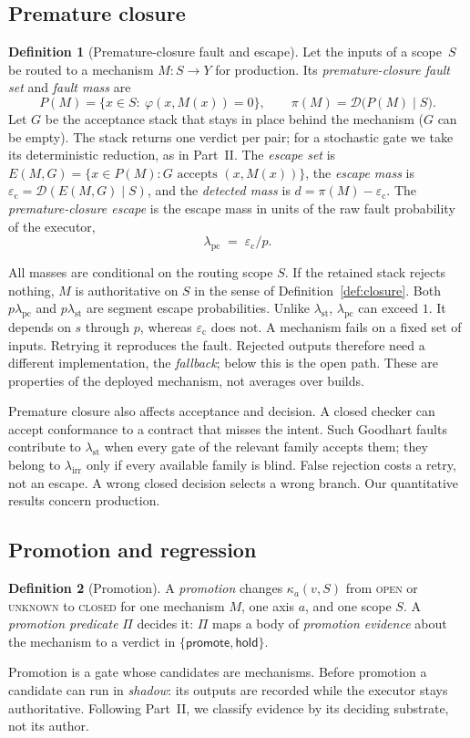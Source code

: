 \documentclass[11pt]{article}
\theoremstyle{definition}
\newtheorem{definition}{Definition}
\theoremstyle{remark}
\newcommand{\lst}{\lambda_{\mathrm{st}}}
\newcommand{\lirr}{\lambda_{\mathrm{irr}}}
\newcommand{\lpc}{\lambda_{\mathrm{pc}}}
\newcommand{\ecl}{\varepsilon_{\mathrm{c}}}
\newcommand{\D}{\mathcal{D}}
\newcommand{\cstate}[1]{\textup{\textsc{#1}}}
\begin{document}
\subsection{Premature closure}\label{sec:premature}
\begin{definition}[Premature-closure fault and escape]\label{def:pc}
Let the inputs of a scope~$S$ be routed to a mechanism $M:S\to Y$ for production. Its
\emph{premature-closure fault set} and \emph{fault mass} are
\[
P(M)=\{x\in S:\ \varphi(x,M(x))=0\},\qquad \pi(M)=\D\bigl(P(M)\mid S\bigr).
\]
Let $G$ be the acceptance stack that stays in place behind the mechanism ($G$ can be empty). The
stack returns one verdict per pair; for a stochastic gate we take its deterministic reduction, as in
Part~II. The
\emph{escape set} is $E(M,G)=\{x\in P(M): G\text{ accepts }(x,M(x))\}$, the \emph{escape mass} is
$\ecl=\D(E(M,G)\mid S)$, and the \emph{detected mass} is $d=\pi(M)-\ecl$. The \emph{premature-closure
escape} is the escape mass in units of the raw fault probability of the executor,
\[
\lpc\;=\;\ecl/p .
\]
\end{definition}

All masses are conditional on the routing scope $S$. If the retained stack rejects nothing, $M$ is
authoritative on $S$ in the sense of Definition~\ref{def:closure}.
Both $p\lpc$ and $p\lst$ are segment escape probabilities.
Unlike $\lst$, $\lpc$ can exceed $1$. It depends on $s$ through $p$, whereas $\ecl$ does not.
A mechanism fails on a fixed set of inputs. Retrying it reproduces the fault.
Rejected outputs therefore need a different implementation, the \emph{fallback}; below this is
the open path. These are properties of the deployed mechanism, not averages over builds.

Premature closure also affects acceptance and decision.
A closed checker can accept conformance to a contract that misses the intent.
Such Goodhart faults contribute to $\lst$ when every gate of the relevant family accepts them;
they belong to $\lirr$ only if every available family is blind.
False rejection costs a retry, not an escape. A wrong closed decision selects a wrong branch.
Our quantitative results concern production.

\subsection{Promotion and regression}\label{sec:transitions}
\begin{definition}[Promotion]\label{def:promotion}
A \emph{promotion} changes $\kappa_a(v,S)$ from \cstate{open} or \cstate{unknown} to \cstate{closed}
for one mechanism $M$, one axis $a$, and one scope $S$. A \emph{promotion predicate} $\Pi$ decides it:
$\Pi$ maps a body of \emph{promotion evidence} about the mechanism to a verdict in
$\{\textsf{promote},\textsf{hold}\}$.
\end{definition}
Promotion is a gate whose candidates are mechanisms. Before promotion a candidate can run in
\emph{shadow}: its outputs are recorded while the executor stays authoritative.
Following Part~II, we classify evidence by its deciding substrate, not its author.
\end{document}
